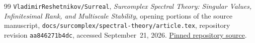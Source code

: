 \documentclass[11pt,a4paper]{article}
\numberwithin{equation}{section}
\theoremstyle{definition}
\theoremstyle{remark}
\begin{document}
\begin{thebibliography}{99}
\texttt{VladimirReshetnikov/Surreal},
\emph{Surcomplex Spectral Theory: Singular Values, Infinitesimal Rank,
and Multiscale Stability}, opening portions of the source manuscript,
\texttt{docs/surcomplex/spectral-theory/article.tex},
repository revision \texttt{aa846271b4dc}, accessed September~21, 2026.
\href{https://github.com/VladimirReshetnikov/Surreal/blob/aa846271b4dcae2c055b216126a87210292ec19b/docs/surcomplex/spectral-theory/article.tex}
{Pinned repository source}.

\end{thebibliography}
\endgroup
\end{document}
